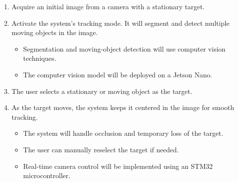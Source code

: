 \documentclass{article}
\begin{document}
\begin{enumerate}
  \item Acquire an initial image from a camera with a stationary target.
  \item Activate the system's tracking mode. It will segment and detect multiple moving
        objects in the image.
        \begin{itemize}
          \item Segmentation and moving-object detection will use computer vision techniques.
          \item The computer vision model will be deployed on a Jetson Nano.
        \end{itemize}
  \item The user selects a stationary or moving object as the target.
  \item As the target moves, the system keeps it centered in the image for smooth
        tracking.
        \begin{itemize}
          \item The system will handle occlusion and temporary loss of the target.
          \item The user can manually reselect the target if needed.
          \item Real-time camera control will be implemented using an STM32 microcontroller.
        \end{itemize}
\end{enumerate}
\end{document}
